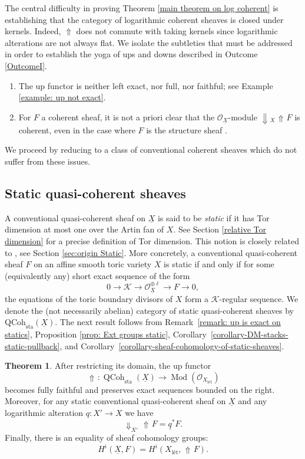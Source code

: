 \documentclass[11pt]{amsart}
\theoremstyle{definition}
\theoremstyle{definition}
\newtheorem{maintheorem}{Theorem}
\DeclareMathOperator{\arrowup}{\!\Uparrow \!}
\newcommand{\LogO}[1]{\mathcal{O}_{{#1}_\text{l\'et}}}
\newcommand{\ul}[1]{\underline{#1}}
\begin{document}
The central difficulty in proving Theorem \ref{main theorem on log coherent} is establishing that the category of logarithmic coherent sheaves is closed under kernels. Indeed, $\Uparrow$ does not commute with taking kernels since logarithmic alterations are not always flat. We isolate the subtleties that must be addressed in order to establish the yoga of ups and downs described in Outcome \ref{OutcomeI}.
\begin{enumerate}
    \item The up functor is neither left exact, nor full, nor faithful; see Example \ref{example: up not exact}.
    \item For $F$ a coherent sheaf, it is not a priori clear that the $\mathcal{O}_{\underline{X}}$-module $\Downarrow\!\!_X\arrowup F$ is coherent, even in the case where $F$ is the structure sheaf \cite[Question 1.7.1]{molcho2023remarks}. 
\end{enumerate}
We proceed by reducing to a class of conventional coherent sheaves which do not suffer from these issues.

\subsection{Static quasi-coherent sheaves} 
A conventional quasi-coherent sheaf on $\underline{X}$ is said to be \textit{static} if it has Tor dimension at most one over the Artin fan of $X$. See Section \ref{relative Tor dimension} for a precise definition of Tor dimension. This notion is closely related to \cite[Definition 2.1.2]{on-toric-log-schemes}, see Section \ref{sec:origin Static}. More concretely, a conventional quasi-coherent sheaf $F$ on an affine smooth toric variety $X$ is static if and only if for some (equivalently any) short exact sequence of the form $$0 \longrightarrow \mathcal{K}\longrightarrow \mathcal{O}_{\underline{X}}^{\oplus \ell}\longrightarrow F \longrightarrow 0,$$
the equations of the toric boundary divisors of $X$ form a $\mathcal{K}$-regular sequence. We denote the (not necessarily abelian) category of static quasi-coherent sheaves by $\text{QCoh}_{\text{sta}}(\underline{X})$. The next result follows from Remark~\ref{remark: up is exact on statics}, Proposition \ref{prop: Ext groups static}, Corollary~\ref{corollary-DM-stacks-static-pullback}, and Corollary~\ref{corollary-sheaf-cohomology-of-static-sheaves}.
\begin{maintheorem}\label{mainthm: Static Good}
    After restricting its domain, the up functor
    $$
        \arrowup\colon \operatorname{QCoh}_{\text{sta}}(\underline{X}) \longrightarrow \operatorname{Mod}(\LogO{X})
    $$
    becomes fully faithful and preserves exact sequences bounded on the right. Moreover, for any static conventional quasi-coherent sheaf on $\ul{X}$ and any logarithmic alteration $q\colon X'\rightarrow X$ we have $$\Downarrow_{X'} \arrowup F = \ul{q}^\ast F.$$ Finally, there is an equality of sheaf cohomology groups:
    $$H^{i}(\underline{X},F) = H^{i}(X_{\text{l\'et}}, \arrowup F).$$
\end{maintheorem}
\end{document}
